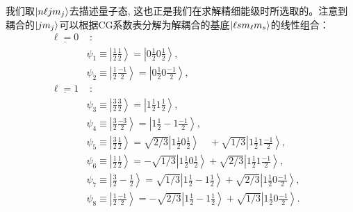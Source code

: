 \documentclass[a4paper,zihao=-4,linespread=1]{ctexrep}
\begin{document}
    我们取$\ket{n\ell j m_j}$去描述量子态, 这也正是我们在求解精细能级时所选取的。注意到耦合的$\ket{jm_j}$可以根据CG系数表分解为解耦合的基底$\ket{\ell s m_\ell m_s}$的线性组合：
    \begin{equation*}
        \begin{aligned}
        \underline{\ell=0}& \text { : } \\
        &\psi_1 \equiv\left|\frac{1}{2} \frac{1}{2}\right\rangle=\left|0 \frac{1}{2} 0 \frac{1}{2}\right\rangle, \\
        &\psi_2 \equiv\left|\frac{1}{2} \frac{-1}{2}\right\rangle=\left|0 \frac{1}{2} 0 \frac{-1}{2}\right\rangle, \\
        \underline{\ell=1}& \text { : } \\
        &\psi_3 \equiv\left|\frac{3}{2} \frac{3}{2}\right\rangle=\left|1 \frac{1}{2} 1 \frac{1}{2}\right\rangle, \\
        &\psi_4 \equiv\left|\frac{3}{2} \frac{-3}{2}\right\rangle=\left|1 \frac{1}{2}-1 \frac{-1}{2}\right\rangle \text {, } \\
        &\psi_5 \equiv\left|\frac{3}{2} \frac{1}{2}\right\rangle=\sqrt{2 / 3}\left|1 \frac{1}{2} 0 \frac{1}{2}\right\rangle \quad+\sqrt{1 / 3}\left|1 \frac{1}{2} 1 \frac{-1}{2}\right\rangle, \\
        &\psi_6 \equiv\left|\frac{1}{2} \frac{1}{2}\right\rangle=-\sqrt{1 / 3}\left|1 \frac{1}{2} 0 \frac{1}{2}\right\rangle+\sqrt{2 / 3}\left|1 \frac{1}{2} 1 \frac{-1}{2}\right\rangle \text {, } \\
        &\psi_7 \equiv\left|\frac{3}{2}-\frac{1}{2}\right\rangle=\sqrt{1 / 3}\left|1 \frac{1}{2}-1 \frac{1}{2}\right\rangle+\sqrt{2 / 3}\left|1 \frac{1}{2} 0 \frac{-1}{2}\right\rangle \text {, } \\
        &\psi_8 \equiv\left|\frac{1}{2} \frac{-1}{2}\right\rangle=-\sqrt{2 / 3}\left|1 \frac{1}{2}-1 \frac{1}{2}\right\rangle+\sqrt{1 / 3}\left|1 \frac{1}{2} 0 \frac{-1}{2}\right\rangle . 
        &
        \end{aligned}
    \end{equation*}
    
\end{document}

